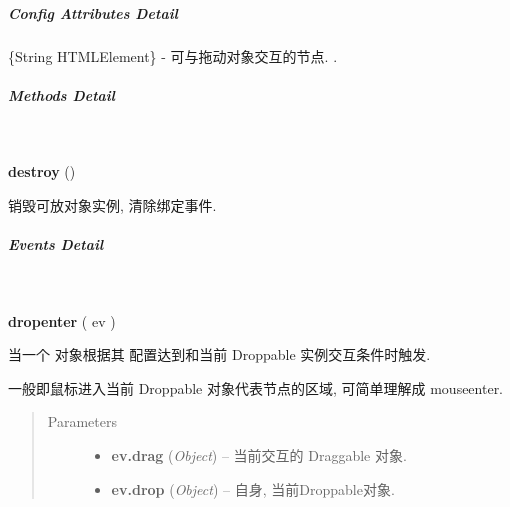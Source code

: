 \documentclass[letterpaper,10pt,english]{sphinxmanual}
\begin{document}
\subparagraph{Config Attributes Detail}
\label{api/component/dd/droppable:config-attributes-detail}

\begin{fulllineitems}
\label{api/component/dd/droppable:Droppable.node}
\{String \textbar{} HTMLElement\} - 可与拖动对象交互的节点. .

\end{fulllineitems}



\subparagraph{Methods Detail}
\label{api/component/dd/droppable:methods-detail}

\begin{fulllineitems}
\label{api/component/dd/droppable:Droppable.destroy}~
\begin{DUlineblock}{0em}
\item[] \textbf{destroy} ()
\item[] 销毁可放对象实例, 清除绑定事件.
\end{DUlineblock}

\end{fulllineitems}



\subparagraph{Events Detail}
\label{api/component/dd/droppable:events-detail}

\begin{fulllineitems}
\label{api/component/dd/droppable:Droppable.dropenter}~
\begin{DUlineblock}{0em}
\item[] \textbf{dropenter} ( ev )
\item[] 当一个 {\hyperref[api/component/dd/draggable:module-Draggable]{}} 对象根据其 {\hyperref[api/component/dd/draggable:Draggable.mode]{}} 配置达到和当前 Droppable 实例交互条件时触发.
\item[] 一般即鼠标进入当前 Droppable 对象代表节点的区域, 可简单理解成 mouseenter.
\end{DUlineblock}
\begin{quote}\begin{description}
\item[{Parameters}] \leavevmode\begin{itemize}
\item {}
\textbf{ev.drag} (\emph{Object}) -- 当前交互的 Draggable 对象.

\item {}
\textbf{ev.drop} (\emph{Object}) -- 自身, 当前Droppable对象.

\end{itemize}

\end{description}\end{quote}

\end{fulllineitems}
\end{document}
